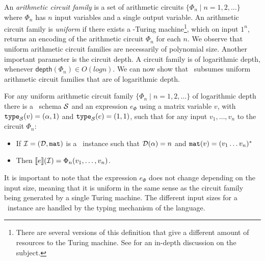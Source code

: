 An {\em arithmetic circuit family} is a set of arithmetic circuits $\{\Phi_n\mid n=1,2,\ldots\}$ where $\Phi_n$ has $n$ input variables and a single output variable. An arithmetic circuit family is {\em uniform} if there exists a \logspace-Turing machine\footnote{There are several versions of this definition that give a different amount of resources to the Turing machine. See \cite{allender} for an in-depth discussion on the subject.}, which on input $1^n$, returns an encoding of the arithmetic circuit $\Phi_n$ for each $n$.
We observe that uniform arithmetic circuit families are necessarily of polynomial size. %
Another important parameter is the circuit depth. A circuit family is of logarithmic depth, whenever $\mathsf{depth}(\Phi_n)\in O(logn)$. We can now show that \langfor\ subsumes uniform arithmetic circuit families that are of logarithmic depth. 


\begin{theorem}
\label{th-circuits-ml}
For any uniform arithmetic circuit family $\{\Phi_n\mid n=1,2,\ldots\}$ of logarithmic depth there is a \langfor\ schema $\mathcal{S}$ and an expression $e_\Phi$ using a matrix variable $v$, with $\texttt{type}_{\mathcal{S}}(v)=(\alpha,1)$ and $\texttt{type}_{\mathcal{S}}(e) = (1,1)$, such that for any input $v_1,\ldots ,v_n$ to the circuit $\Phi_n$:
\begin{itemize}
\item If $\mathcal{I} = (\mathcal{D},\texttt{mat})$ is a \lang\ instance such that $\mathcal{D}(\alpha) = n$ and $\texttt{mat}(v) = (v_1 \ldots v_n)^*$
\item Then $\llbracket e \rrbracket(\mathcal{I}) = \Phi_n(v_1,\ldots ,v_n)$.
\end{itemize}
\end{theorem}
It is important to note that the expression $e_\Phi$ does not change depending on the input size, meaning that it is uniform in the same sense as the circuit family being generated by a single Turing machine. The different input sizes for a \langfor\ instance are handled by the typing mechanism of the language. 


